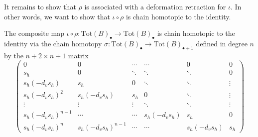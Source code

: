 It remains to show that $\rho$ is associated with a deformation retraction for $\iota$. In other words, we want to show that $\iota\circ \rho$ is chain homotopic to the identity.

\begin{prop}[label=prop:A6]
    The composite map $\iota\circ \rho:\text{Tot}(B)_\bullet\to \text{Tot}(B)_\bullet$ is chain homotopic to the identity via the chain homotopy $\sigma:\text{Tot}(B)_\bullet\to \text{Tot}(B)_{\bullet+1}$ defined in degree $n$ by the $n+2\times n+1$ matrix
    \begin{equation*}
        \begin{pmatrix}
                0 & 0 & \cdots & \cdots & 0 & 0 \\
                s_h & 0 & \ddots & \ddots & \ddots & 0 \\
                s_h(-d_vs_h) & s_h & 0 & \ddots & \ddots & \vdots \\
                s_h(-d_vs_h)^2 & s_h(-d_vs_h) & s_h & 0 & \ddots & \vdots \\
                \vdots & \vdots & \vdots & \ddots & \ddots & \vdots \\
                s_h(-d_vs_h)^{n-1} & \cdots & \cdots & s_h(-d_vs_h) & s_h & 0 \\
                s_h(-d_vs_h)^n & s_h(-d_vs_h)^{n-1} & \cdots & \cdots & s_h(-d_vs_h) & s_h
        \end{pmatrix}
    \end{equation*}
\end{prop}
